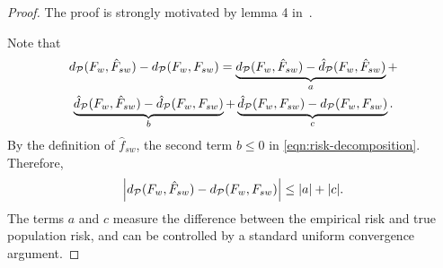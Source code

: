 \begin{proof}
The proof is strongly motivated by lemma 4 in~\citet{charikar2024quantifying}.

Note that
\begin{multline}
    \label{eqn:risk-decomposition}
    d_{\mathcal{P}}(F_w, \hat{F}_{sw}) - d_{\mathcal{P}}(F_w, F_{sw}) = \underbrace{d_{\mathcal{P}}(F_w, \hat{F}_{sw}) - \hat{d}_{\mathcal{P}}(F_w, \hat{F}_{sw})}_{a} + \\ \underbrace{\hat{d}_{\mathcal{P}}(F_w, \hat{F}_{sw}) -  \hat{d}_{\mathcal{P}}(F_w, F_{sw})}_{b} + \underbrace{\hat{d}_{\mathcal{P}}(F_w, F_{sw}) - d_{\mathcal{P}}(F_w, F_{sw})}_{c}.
\end{multline}
By the definition of $\hat{f}_{sw}$, the second term $b\le 0$ in \eqref{eqn:risk-decomposition}. 
Therefore,
\begin{align} \label{proof:ineq:conv}
    \left| d_{\mathcal{P}}(F_w, \hat{F}_{sw}) - d_{\mathcal{P}}(F_w, F_{sw}) \right| \le |a| +|c|.
\end{align}
The terms $a$ and $c$ measure the difference between the empirical risk and true population risk, and can be controlled by a standard uniform convergence argument.


\end{proof}
